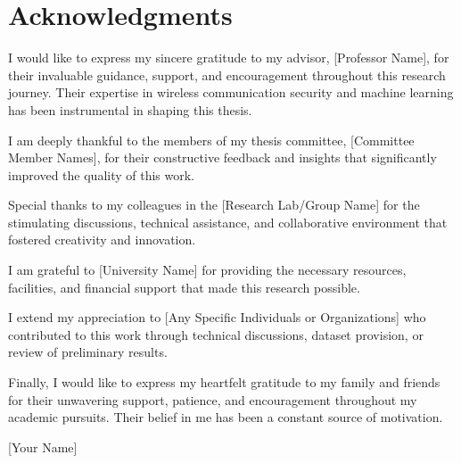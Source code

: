 \chapter*{Acknowledgments}

I would like to express my sincere gratitude to my advisor, [Professor Name], for their invaluable guidance, support, and encouragement throughout this research journey. Their expertise in wireless communication security and machine learning has been instrumental in shaping this thesis.

I am deeply thankful to the members of my thesis committee, [Committee Member Names], for their constructive feedback and insights that significantly improved the quality of this work.

Special thanks to my colleagues in the [Research Lab/Group Name] for the stimulating discussions, technical assistance, and collaborative environment that fostered creativity and innovation.

I am grateful to [University Name] for providing the necessary resources, facilities, and financial support that made this research possible.

I extend my appreciation to [Any Specific Individuals or Organizations] who contributed to this work through technical discussions, dataset provision, or review of preliminary results.

Finally, I would like to express my heartfelt gratitude to my family and friends for their unwavering support, patience, and encouragement throughout my academic pursuits. Their belief in me has been a constant source of motivation.

[Your Name]\\
[Date]

